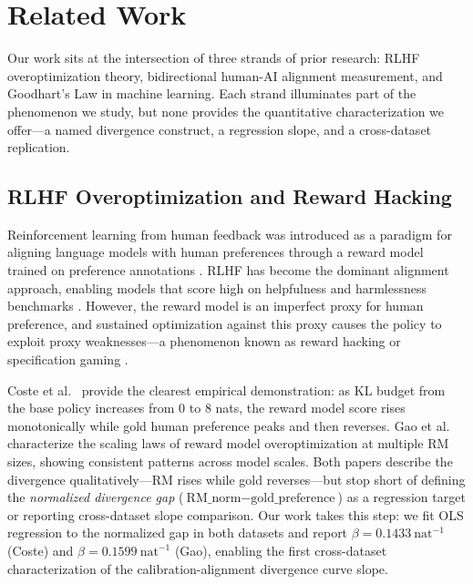 \section{Related Work}
\label{sec:related}

Our work sits at the intersection of three strands of prior research: RLHF overoptimization theory, bidirectional human-AI alignment measurement, and Goodhart's Law in machine learning. Each strand illuminates part of the phenomenon we study, but none provides the quantitative characterization we offer---a named divergence construct, a regression slope, and a cross-dataset replication.

\subsection{RLHF Overoptimization and Reward Hacking}

Reinforcement learning from human feedback was introduced as a paradigm for aligning language models with human preferences through a reward model trained on preference annotations \cite{Ouyang2022Training,Christiano2017Deep}. RLHF has become the dominant alignment approach, enabling models that score high on helpfulness and harmlessness benchmarks \cite{Bai2022Training,Stiennon2020Learning}. However, the reward model is an imperfect proxy for human preference, and sustained optimization against this proxy causes the policy to exploit proxy weaknesses---a phenomenon known as reward hacking or specification gaming \cite{Krakovna2020Specification,Skalse2022Defining}.

Coste et al.~\cite{Coste2023Reward} provide the clearest empirical demonstration: as KL budget from the base policy increases from 0 to 8 nats, the reward model score rises monotonically while gold human preference peaks and then reverses. Gao et al.~\cite{Gao2023Scaling} characterize the scaling laws of reward model overoptimization at multiple RM sizes, showing consistent patterns across model scales. Both papers describe the divergence qualitatively---RM rises while gold reverses---but stop short of defining the \emph{normalized divergence gap} ($\text{RM\_norm} - \text{gold\_preference}$) as a regression target or reporting cross-dataset slope comparison. Our work takes this step: we fit OLS regression to the normalized gap in both datasets and report $\beta = 0.1433\ \text{nat}^{-1}$ (Coste) and $\beta = 0.1599\ \text{nat}^{-1}$ (Gao), enabling the first cross-dataset characterization of the calibration-alignment divergence curve slope.

